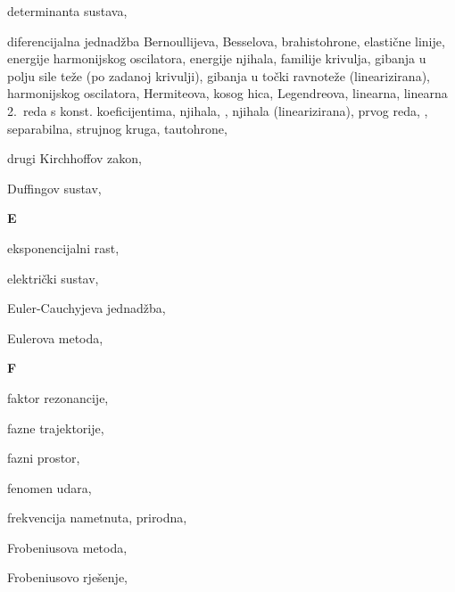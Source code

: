\begin{theindex}
  \item determinanta sustava, 
  \item diferencijalna jednad\v zba
    \subitem Bernoullijeva, 
    \subitem Besselova, 
    \subitem brahistohrone, 
    \subitem elasti\v cne linije, 
    \subitem energije harmonijskog oscilatora, 
    \subitem energije njihala, 
    \subitem familije krivulja, 
    \subitem gibanja u polju sile te\v ze (po zadanoj \mbox{krivulji}), 
    \subitem gibanja u to\v cki ravnote\v ze (linearizirana), 
    \subitem harmonijskog oscilatora, 
    \subitem Hermiteova, 
    \subitem kosog hica, 
    \subitem Legendreova, 
    \subitem linearna, 
    \subitem linearna 2.~reda s konst. \mbox{koeficijentima}, 
    \subitem njihala, , 
    \subitem njihala (linearizirana), 
    \subitem prvog reda, , 
    \subitem separabilna, 
    \subitem strujnog kruga, 
    \subitem tautohrone, 
  \item drugi Kirchhoffov zakon, 
  \item Duffingov sustav, 

  \indexspace
{\bfseries\hfil E\hfil}\nopagebreak

  \item eksponencijalni rast, 
  \item elektri\v cki sustav, 
  \item Euler-Cauchyjeva jednad\v zba, 
  \item Eulerova metoda, 

  \indexspace
{\bfseries\hfil F\hfil}\nopagebreak

  \item faktor rezonancije, 
  \item fazne trajektorije, 
  \item fazni prostor, 
  \item fenomen udara, 
  \item frekvencija
    \subitem nametnuta, 
    \subitem prirodna, 
  \item Frobeniusova metoda, 
  \item Frobeniusovo rje\v senje, 


\end{theindex}

